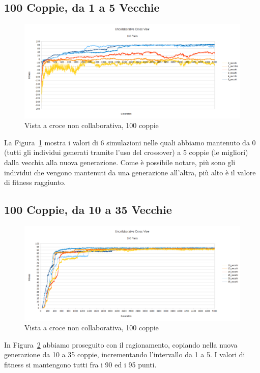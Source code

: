 \subsection{100 Coppie, da 1 a 5 Vecchie}
\begin{figure}[ht]
	\centering
	\includegraphics[scale=0.7,angle=90]{imgs/cross_nc_100_pairs_0_5_old.png}
	\caption{Vista a croce non collaborativa, 100 coppie}
	\label{figure:cross_nc_100_0_5}
\end{figure}
La Figura~\ref{figure:cross_nc_100_0_5} mostra i valori di 6 simulazioni nelle
quali abbiamo mantenuto da 0 (tutti gli individui generati tramite l'uso del
crossover) a 5 coppie (le migliori) dalla vecchia alla nuova generazione. Come è
possibile notare, più sono gli individui che vengono mantenuti da una
generazione all'altra, più alto è il valore di fitness raggiunto.

\subsection{100 Coppie, da 10 a 35 Vecchie}
\begin{figure}[ht]
	\centering
	\includegraphics[scale=0.7,angle=90]{imgs/cross_nc_100_pairs_10_35_old.png}
	\caption{Vista a croce non collaborativa, 100 coppie}
	\label{figure:cross_nc_100_10_35}
\end{figure}
In Figura~\ref{figure:cross_nc_100_10_35} abbiamo proseguito con il
ragionamento, copiando nella nuova generazione da 10 a 35 coppie, incrementando
l'intervallo da 1 a 5. I valori di fitness si mantengono tutti fra i 90 ed i 95
punti.

